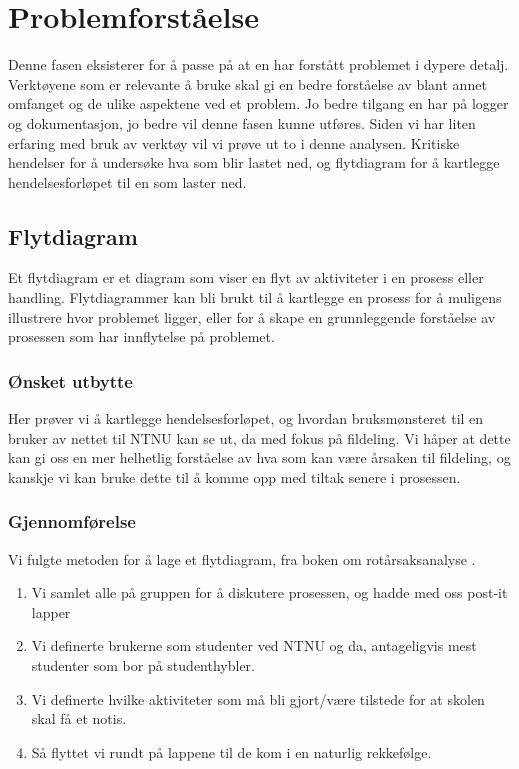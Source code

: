 \chapter{Problemforståelse}
Denne fasen eksisterer for å passe på at en har forstått problemet i dypere detalj. Verktøyene som er relevante å bruke skal gi en bedre forståelse av blant annet omfanget og de ulike aspektene ved et problem. Jo bedre tilgang en har på logger og dokumentasjon, jo bedre vil denne fasen kunne utføres. Siden vi har liten erfaring med bruk av verktøy vil vi prøve ut to i denne analysen. Kritiske hendelser for å undersøke hva som blir lastet ned, og flytdiagram for å kartlegge hendelsesforløpet til en som laster ned.

\section{Flytdiagram}
Et flytdiagram er et diagram som viser en flyt av aktiviteter i en prosess eller handling. Flytdiagrammer kan bli brukt til å kartlegge en prosess for å muligens illustrere hvor problemet ligger, eller for å skape en grunnleggende forståelse av prosessen som har innflytelse på problemet. 

\subsection{Ønsket utbytte}
Her prøver vi å kartlegge hendelsesforløpet, og hvordan bruksmønsteret til en bruker av nettet til NTNU kan se ut, da med fokus på fildeling. Vi håper at dette kan gi oss en mer helhetlig forståelse av hva som kan være årsaken til fildeling, og kanskje vi kan bruke dette til å komme opp med tiltak senere i prosessen.
\subsection{Gjennomførelse}
Vi fulgte metoden for å lage et flytdiagram, fra boken om rotårsaksanalyse \cite{RCA}.
\begin{enumerate}
    \item Vi samlet alle på gruppen for å diskutere prosessen, og hadde med oss post-it lapper
    \item Vi definerte brukerne som studenter ved NTNU og da, antageligvis mest studenter som bor på studenthybler.
    \item Vi definerte hvilke aktiviteter som må bli gjort/være tilstede for at skolen skal få et notis.
    \item Så flyttet vi rundt på lappene til de kom i en naturlig rekkefølge.
\end{enumerate}


